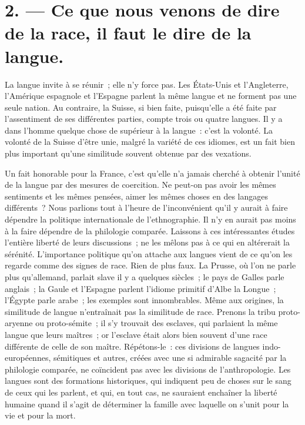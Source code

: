 \documentclass[french,twoside]{book} %
\newcommand\orgName[1]{#1}
\begin{document}
\section[{2. — Ce que nous venons de dire de la race, il faut le dire de la langue.}]{2. — Ce que nous venons de dire de la race, il faut le dire de la langue.}

\noindent La langue invite à se réunir ; elle n’y force pas. Les {\orgName États-Unis} et l’{\orgName Angleterre}, l’{\orgName Amérique espagnole} et l’{\orgName Espagne} parlent la même langue et ne forment pas une seule nation. Au contraire, la {\orgName Suisse}, si bien faite, puisqu’elle a été faite par l’assentiment de ses différentes parties, compte trois ou quatre langues. Il y a dans l’homme quelque chose de supérieur à la langue : c’est la volonté. La volonté de la {\orgName Suisse} d’être unie, malgré la variété de ces idiomes, est un fait bien plus important qu’une similitude souvent obtenue par des vexations.\par
Un fait honorable pour la {\orgName France}, c’est qu’elle n’a jamais cherché à obtenir l’unité de la langue par des mesures de coercition. Ne peut-on pas avoir les mêmes sentiments et les mêmes pensées, aimer les mêmes choses en des langages différents ? Nous parlions tout à l’heure de l’inconvénient qu’il y aurait à faire dépendre la politique internationale de l’ethnographie. Il n’y en aurait pas moins à la faire dépendre de la philologie comparée. Laissons à ces intéressantes études l’entière liberté de leurs discussions ; ne les mêlons pas à ce qui en altérerait la sérénité. L’importance politique qu’on attache aux langues vient de ce qu’on les regarde comme des signes de race. Rien de plus faux. La {\orgName Prusse}, où l’on ne parle plus qu’allemand, parlait slave il y a quelques siècles ; le {\orgName pays de Galles} parle anglais ; la {\orgName Gaule} et l’{\orgName Espagne} parlent l’idiome primitif d’{\orgName Albe la Longue} ; l’{\orgName Égypte} parle arabe ; les exemples sont innombrables. Même aux origines, la similitude de langue n’entraînait pas la similitude de race. Prenons la {\orgName tribu proto-aryenne} ou proto-sémite ; il s’y trouvait des esclaves, qui parlaient la même langue que leurs maîtres ; or l’esclave était alors bien souvent d’une race différente de celle de son maître. Répétons-le : ces divisions de langues indo-européennes, sémitiques et autres, créées avec une si admirable sagacité par la philologie comparée, ne coïncident pas avec les divisions de l’anthropologie. Les langues sont des formations historiques, qui indiquent peu de choses sur le sang de ceux qui les parlent, et qui, en tout cas, ne sauraient enchaîner la liberté humaine quand il s’agit de déterminer la famille avec laquelle on s’unit pour la vie et pour la mort.\par
\end{document}
